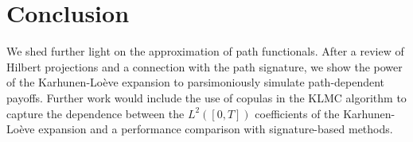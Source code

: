 \section*{Conclusion}
We shed further light on the approximation of path functionals. After a  review of Hilbert projections and a connection with the path signature, we show the power of the Karhunen-Loève expansion to parsimoniously simulate path-dependent payoffs. 
Further work would include the use of copulas in the  KLMC algorithm to capture the dependence between the $L^2([0,T])$ coefficients of the Karhunen-Loève expansion and a performance comparison with signature-based methods. 